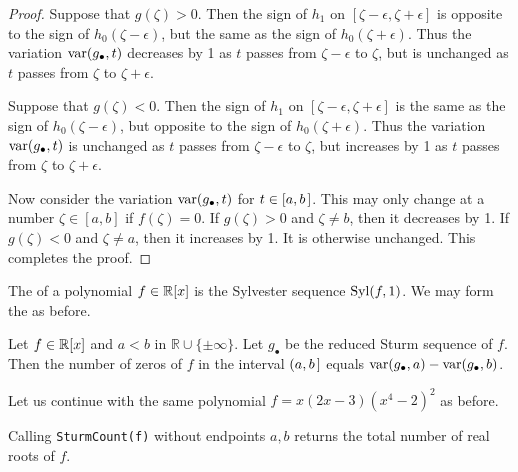 \begin{proof}
 Suppose that $g(\zeta)>0$.
 Then the sign of $h_1$ on $[\zeta-\epsilon,\zeta+\epsilon]$ is opposite to the sign of $h_0(\zeta-\epsilon)$, but the same as the sign of
 $h_0(\zeta+\epsilon)$.
 Thus the variation $\operatorname{{\rm var}}(g_\bullet,t)$ decreases by 1 as $t$ passes from $\zeta{-}\epsilon$ to $\zeta$, but is unchanged as $t$
 passes from $\zeta$ to $\zeta{+}\epsilon$.
  

 Suppose that $g(\zeta)<0$.
 Then the sign of $h_1$ on $[\zeta-\epsilon,\zeta+\epsilon]$ is the same as the sign of $h_0(\zeta-\epsilon)$, but opposite to the sign of
 $h_0(\zeta+\epsilon)$.
 Thus the variation $\operatorname{{\rm var}}(g_\bullet,t)$ is unchanged as $t$ passes from $\zeta-\epsilon$ to $\zeta$, but increases by 1 as $t$ 
 passes from $\zeta$ to $\zeta+\epsilon$.

 Now consider the variation $\operatorname{{\rm var}}(g_\bullet,t)$ for $t\in[a,b\hspace{.05cm}]$.
 This may only change at a number $\zeta\in[a,b]$ if $f(\zeta)=0$.
 If $g(\zeta)>0$ and $\zeta\neq b$, then it decreases by 1.
 If $g(\zeta)<0$ and $\zeta\neq a$, then it increases by 1.
 It is otherwise unchanged.
 This completes the proof.
 \end{proof}

The  of a polynomial $f\in\mathbb{R}[x]$ is the Sylvester sequence $\operatorname{{\rm Syl}}(f,1)$.
We may form the  as before.

\begin{corollary}
  Let $f\in\mathbb{R}[x]$ and $a<b$ in $\mathbb{R}\cup\{\pm\infty\}$.
  Let $g_\bullet$ be the reduced Sturm sequence of $f$.
  Then the number of zeros of $f$ in the interval $(a,b\hspace{.05cm}]$ equals  $\operatorname{{\rm var}}(g_\bullet,a) - \operatorname{{\rm var}}(g_\bullet,b)$.
\end{corollary}

Let us continue with the same polynomial $f=x(2x-3)(x^4-2)^2$ as before.
%
\begin{leftbar}

\end{leftbar}
%
Calling {\tt SturmCount(f)} without endpoints $a,b$ returns the total number of real roots of $f$.

